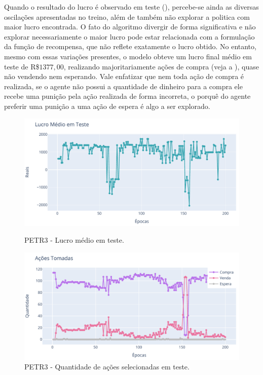 Quando o resultado do lucro é observado em teste (), percebe-se ainda as diversas oscilações apresentadas no treino, além de também não explorar a politica com maior lucro encontrada. O fato do algoritmo divergir de forma significativa e não explorar necessariamente o maior lucro pode estar relacionada com a formulação da função de recompensa, que não reflete exatamente o lucro obtido. No entanto, mesmo com essas variações presentes, o modelo obteve um lucro final médio em teste de R\$$1377,00$, realizando majoritariamente ações de compra (veja a ), quase não vendendo nem esperando. Vale enfatizar que nem toda ação de compra é realizada, se o agente não possui a quantidade de dinheiro para a compra ele recebe uma punição pela ação realizada de forma incorreta, o porquê do agente preferir uma punição a uma ação de espera é algo a ser explorado.

\begin{figure}[htbp]
    \centering 
    \begin{minipage}[b]{0.45\linewidth}
        \includegraphics[width=\linewidth]{img/ddpg/petr3/clean/profit}
        \caption{PETR3 - Lucro médio em teste.} 
        \label{petr_clean_profit}
    \end{minipage}
    \quad
    \begin{minipage}[b]{0.45\linewidth}
        \includegraphics[width=\linewidth]{img/ddpg/petr3/clean/actions}
        \caption{PETR3 - Quantidade de ações selecionadas em teste.}
        \label{petr_clean_act}
    \end{minipage}
\end{figure}

